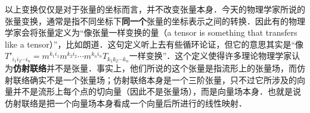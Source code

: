 以上变换仅仅是对于张量的坐标而言，并不改变张量本身．今天的物理学家所说的张量变换，通常是指不同坐标下\textbf{同一个}张量的坐标表示之间的转换．因此有的物理学家会将张量定义为“像张量一样变换的量（a tensor is something that transfers like a tensor）”，比如朗道．这句定义听上去有些循环论证，但它的意思其实是“像$T'_{i_1i_2\cdots i_n}=m^{k_1i_1}m^{k_2i_2}\cdots m^{k_ni_n}T_{k_1k_2\cdots k_n}$一样变换”．这个定义使得许多理论物理学家认为\textbf{仿射联络}并不是张量．事实上，他们所说的这个张量是指流形上的张量场，而仿射联络确实不是一个张量场；仿射联络本身是一个三阶张量，只不过它所涉及的向量并不是流形上每个点的切向量（因此不是张量场），而是向量场本身．也就是说仿射联络是把一个向量场本身看成一个向量后所进行的线性映射．







